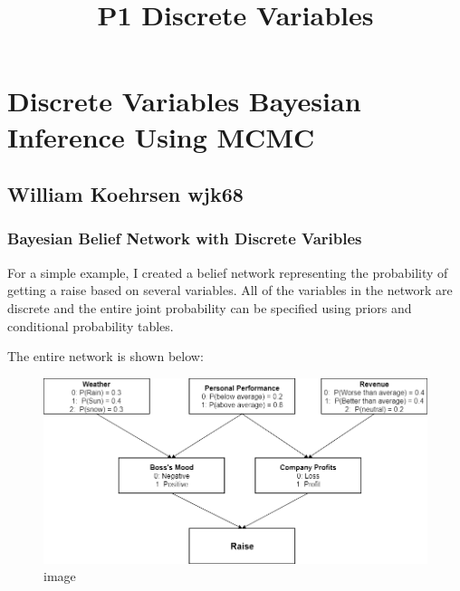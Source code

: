 \documentclass[11pt]{article}
\title{P1 Discrete Variables}
\makeatletter
\def\maxwidth{\ifdim\Gin@nat@width>\linewidth\linewidth
    \else\Gin@nat@width\fi}
\let\Oldincludegraphics\includegraphics
\renewcommand{\includegraphics}[1]{\Oldincludegraphics[width=.8\maxwidth]{#1}}
\makeatother
\begin{document}
    
    
    \maketitle
    
    

    
    \hypertarget{discrete-variables-bayesian-inference-using-mcmc}{%
\section{Discrete Variables Bayesian Inference Using
MCMC}\label{discrete-variables-bayesian-inference-using-mcmc}}

\hypertarget{william-koehrsen-wjk68}{%
\subsection{William Koehrsen wjk68}\label{william-koehrsen-wjk68}}

    \hypertarget{bayesian-belief-network-with-discrete-varibles}{%
\subsubsection{Bayesian Belief Network with Discrete
Varibles}\label{bayesian-belief-network-with-discrete-varibles}}

For a simple example, I created a belief network representing the
probability of getting a raise based on several variables. All of the
variables in the network are discrete and the entire joint probability
can be specified using priors and conditional probability tables.

The entire network is shown below:

\begin{figure}
\centering
\includegraphics{images/Raise Network.png}
\caption{image}
\end{figure}
\end{document}
